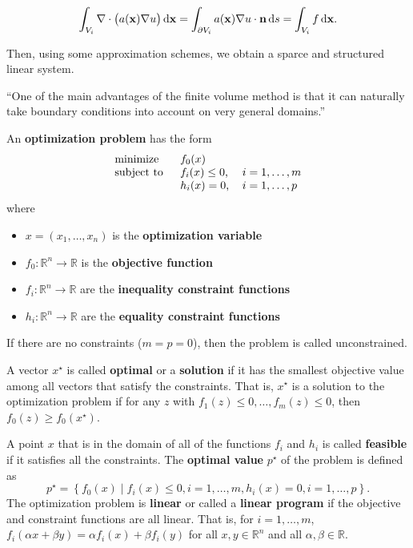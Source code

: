 \documentclass[11pt]{article}
\begin{document}
$$\int_{V_i}\nabla\cdot\left(a(\mathbf{x})\nabla u\right)\dif\mathbf{x}=\int_{\partial V_i}a(\mathbf{x})\nabla u\cdot\mathbf{n}\dif s=\int_{V_i}f\dif\mathbf{x}.$$

Then, using some approximation schemes, we obtain a sparce and structured linear system.

``One of the main advantages of the finite volume method is that it can naturally take boundary conditions into account on very general domains.'' \cite{Gander2018}

{\huge {}}

An {\color{tiananmen}\textbf{optimization problem}} has the form
{\color{baystate}
\begin{equation}
	\begin{tabular}{lll}
		\text{minimize }   & $f_0(x)$          & \\
		\text{subject to } & $f_i(x)\leq 0$, & $i=1,\ldots, m$\\
						   & $h_i(x) = 0$,      & $i=1,\ldots, p$
	\end{tabular}\label{Optimization}
\end{equation}
}
where
\begin{itemize}
	\item {\color{baystate} $x=\left(x_1,\ldots,x_n\right)$} is the {\color{tiananmen} \textbf{optimization variable}}
	\item {\color{baystate} $f_0 : \mathbb{R}^n\rightarrow\mathbb{R}$} is the {\color{tiananmen} \textbf{objective function}}
	\item {\color{baystate} $f_i : \mathbb{R}^n\rightarrow\mathbb{R}$} are the {\color{tiananmen} \textbf{inequality constraint functions}}
	\item {\color{baystate} $h_i : \mathbb{R}^n\rightarrow\mathbb{R}$} are the {\color{tiananmen}\textbf{equality constraint functions}}
\end{itemize}

If there are no constraints ($m=p=0$), then the problem is called {\color{tiananmen}unconstrained}.

A vector {\color{baystate} $x^\star$} is called {\color{tiananmen} \textbf{optimal}} or a {\color{tiananmen} \textbf{solution}} if it has the smallest objective value among all vectors that satisfy the constraints. That is, $x^\star$ is a solution to the optimization problem if {\color{baystate} for any $z$ with $f_1(z)\leq 0,\ldots, f_m(z)\leq 0$, then $f_0(z)\geq f_0(x^\star)$}.

A point $x$ that is in the domain of all of the functions $f_i$ and $h_i$ is called {\color{tiananmen}\textbf{feasible}} if it satisfies all the constraints. The {\color{tiananmen} \textbf{optimal value}} {\color{baystate}$p^\star$} of the problem is defined as {\color{baystate}$$p^\star=\left\lbrace f_0(x) \mid f_i(x)\leq 0, i=1,\ldots,m, h_i(x)=0, i=1,\ldots,p\right\rbrace.$$}
The optimization problem is {\color{tiananmen}\textbf{linear}} or called a {\color{tiananmen}\textbf{linear program}} if the objective and constraint functions are all linear. That is, {\color{baystate} for $i=1,\ldots,m$, $f_i(\alpha x+\beta y)=\alpha f_i(x)+\beta f_i(y)$ for all $x,y\in\mathbb{R}^n$ and all $\alpha,\beta\in\mathbb{R}$}.
\end{document}
